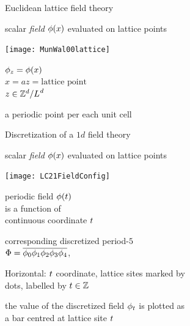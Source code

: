 \begin{frame}{Euclidean lattice field theory}
    \begin{block}{scalar \emph{field} $\phi(x)$}
 evaluated on lattice points

\begin{center}
            \begin{minipage}[c]{0.32\textwidth}\begin{center}
\texttt{[image: MunWal00lattice]}
            \end{center}
            \end{minipage}
            \hspace{2ex}
            \begin{minipage}[c]{0.46\textwidth}
$\phi_z
=
\phi(x)$
\\
$
x = az= \mbox{lattice point}$
\\
$
z \in \mathbb{Z}^d/{L_{}}^d
$
            \end{minipage}
\end{center}
a periodic point per each unit cell
    \end{block}
\end{frame} %

\begin{frame}{Discretization of a $1d$ field theory}
    \begin{block}{scalar \emph{field} $\phi(x)$ evaluated on lattice points}

\begin{center}
\texttt{[image: LC21FieldConfig]}

\bigskip
            \begin{minipage}[c]{0.42\textwidth}
periodic field $\phi(t)$
\\
is a function of
\\
continuous coordinate $t$
            \end{minipage}
            \hspace{2ex}
            \begin{minipage}[c]{0.42\textwidth}
corresponding discretized period-$5$ {\lattstate}
\\
$\Phi={\overline{\phi_0 \phi_1 \phi_2 \phi_3 \phi_4}}$,
            \end{minipage}
\end{center}
    \end{block}
Horizontal: $t$ coordinate, lattice sites marked by
\\
dots, labelled by $t\in\mathbb{Z}$

\medskip
the value of the discretized field $\phi_{t}$ is plotted as
\\
a bar centred at lattice site $t$
\end{frame} %

